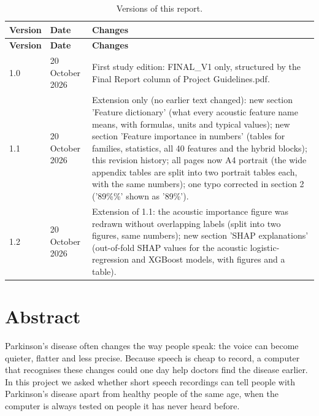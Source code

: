 \documentclass[11pt,a4paper]{article}
\begin{document}
\begin{center}\small\renewcommand{\arraystretch}{1.15}
\begin{longtable}{>{\raggedright\arraybackslash}p{1.56cm}>{\raggedright\arraybackslash}p{2.74cm}>{\raggedright\arraybackslash}p{10.94cm}}
\caption{Versions of this report.}\\
\toprule
\textbf{\hspace{0pt}Version} & \textbf{\hspace{0pt}Date} & \textbf{\hspace{0pt}Changes}\\\midrule\endfirsthead
\toprule
\textbf{\hspace{0pt}Version} & \textbf{\hspace{0pt}Date} & \textbf{\hspace{0pt}Changes}\\\midrule\endhead
\bottomrule\endfoot
\hspace{0pt}1.0 & \hspace{0pt}20 October 2026 & \hspace{0pt}First study edition: FINAL\_\allowbreak{}V1 only, structured by the Final Report column of Project Guidelines.pdf.\\
\hspace{0pt}1.1 & \hspace{0pt}20 October 2026 & \hspace{0pt}Extension only (no earlier text changed): new section 'Feature dictionary' (what every acoustic feature name means, with formulas, units and typical values); new section 'Feature importance in numbers' (tables for families, statistics, all 40 features and the hybrid blocks); this revision history; all pages now A4 portrait (the wide appendix tables are split into two portrait tables each, with the same numbers); one typo corrected in section 2 ('89\%\%' shown as '89\%').\\
\hspace{0pt}1.2 & \hspace{0pt}20 October 2026 & \hspace{0pt}Extension of 1.1: the acoustic importance figure was redrawn without overlapping labels (split into two figures, same numbers); new section 'SHAP explanations' (out-of-fold SHAP values for the acoustic logistic-regression and XGBoost models, with figures and a table).\\
\end{longtable}\end{center}
\section{Abstract}\label{sec:abstract}
Parkinson's disease often changes the way people speak: the voice can become quieter, flatter and less precise. Because speech is cheap to record, a computer that recognises these changes could one day help doctors find the disease earlier. In this project we asked whether short speech recordings can tell people with Parkinson's disease apart from healthy people of the same age, when the computer is always tested on people it has never heard before.
\end{document}
